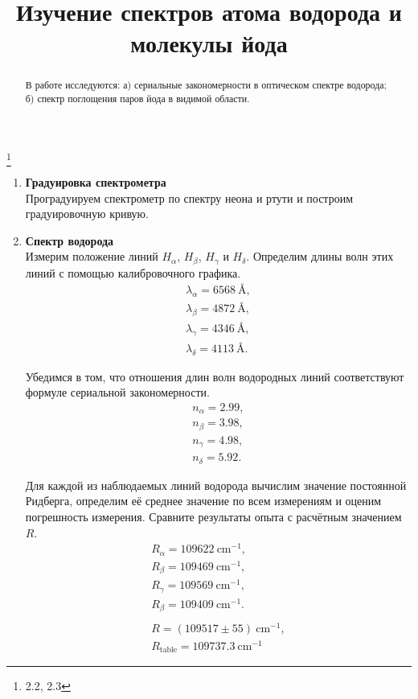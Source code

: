 


\title{Изучение спектров атома водорода и молекулы йода}
\thanks{2.2, 2.3}



\begin{abstract}
В работе исследуются: а) сериальные закономерности в оптическом спектре водорода; б) спектр поглощения паров йода в видимой области.

\end{abstract}


\maketitle

\begin{enumerate}

\item 
\textbf{Градуировка спектрометра}\\
Проградуируем спектрометр по спектру неона и ртути и построим градуировочную кривую.

\item
\textbf{Спектр водорода}\\
Измерим положение линий $H_{\alpha}$, $H_{\beta}$, $H_{\gamma}$ и $H_{\delta}$. Определим длины волн этих линий с помощью калибровочного графика.
\begin{gather*}
\lambda_{\alpha} = 6568~\text{\AA},\\
\lambda_{\beta} = 4872~\text{\AA},\\
\lambda_{\gamma} = 4346~\text{\AA},\\
\lambda_{\delta} = 4113~\text{\AA}.
\end{gather*}

Убедимся в том, что отношения длин волн водородных линий соответствуют формуле сериальной закономерности.
\begin{gather*}
n_{\alpha} = 2.99,\\
n_{\beta} = 3.98,\\
n_{\gamma} = 4.98,\\
n_{\delta} = 5.92.
\end{gather*}

Для каждой из наблюдаемых линий водорода вычислим значение постоянной Ридберга, определим её среднее значение по всем измерениям и оценим погрешность измерения. Сравните результаты опыта с расчётным значением $R$.
\begin{gather*}
R_{\alpha} = 109622~\text{cm}^{-1},\\
R_{\beta} = 109469~\text{cm}^{-1},\\
R_{\gamma} = 109569~\text{cm}^{-1},\\
R_{\beta} = 109409~\text{cm}^{-1}.\\
\\
R = (109517 \pm 55)~\text{cm}^{-1},\\
R_{\text{table}} = 109737.3~\text{cm}^{-1}
\end{gather*}


\end{enumerate}
